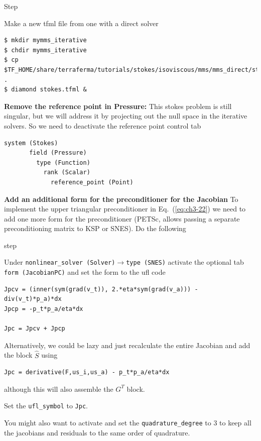 \begin{steps}{Step}
\item Make a new tfml file from one with a direct solver
  \begin{lstlisting}[style=Bash]
$ mkdir mymms_iterative
$ chdir mymms_iterative
$ cp $TF_HOME/share/terraferma/tutorials/stokes/isoviscous/mms/mms_direct/stokes.tfml .
$ diamond stokes.tfml &
  \end{lstlisting}%
\item \textbf{Remove the reference point in Pressure:} This stokes
  problem is still singular, but we will address it by projecting out
  the null space in the iterative solvers.  So we need to deactivate the
  reference point control tab
  \begin{lstlisting}[style=Python]
    system (Stokes)
       field (Pressure)
         type (Function)
           rank (Scalar)
             reference_point (Point)
  \end{lstlisting}
\item \textbf{Add an additional form for the preconditioner for the
    Jacobian} To implement the upper triangular preconditioner in Eq.\
  (\ref{eq:ch3-22}) we need to add one more form for the preconditioner
  (PETSc, allows passing a separate preconditioning matrix to KSP or
  SNES). Do the following
  \begin{steps}{step}
  \item Under \texttt{nonlinear\_solver
    (Solver)}$\rightarrow$\texttt{type (SNES)} activate the optional
  tab \texttt{form (JacobianPC)} and set the form to the ufl code
  \begin{lstlisting}[style=UFL]
Jpcv = (inner(sym(grad(v_t)), 2.*eta*sym(grad(v_a))) - div(v_t)*p_a)*dx
Jpcp = -p_t*p_a/eta*dx

Jpc = Jpcv + Jpcp
  \end{lstlisting}
Alternatively,  we could be lazy and just recalculate the entire
Jacobian and add the  block $\hat{S}$ using
\begin{lstlisting}[style=UFL]
Jpc = derivative(F,us_i,us_a) - p_t*p_a/eta*dx
\end{lstlisting}
although this will also assemble the $G^{T}$ block.
\item Set the \texttt{ufl\_symbol} to
  \texttt{Jpc}.
\item You might also want to activate and set the
  \texttt{quadrature\_degree} to 3 to keep all the jacobians and
  residuals to the same order of quadrature.
  \end{steps}


\end{steps}
